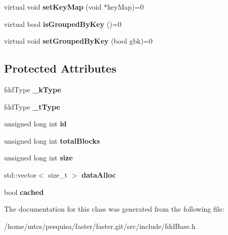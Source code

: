 \begin{DoxyCompactItemize}
\item 
\hypertarget{classfaster_1_1fddBase_ab36e7bd326034eca0721347b2a5b1bfe}{}virtual void {\bfseries set\+Key\+Map} (void $\ast$key\+Map)=0\label{classfaster_1_1fddBase_ab36e7bd326034eca0721347b2a5b1bfe}

\item 
\hypertarget{classfaster_1_1fddBase_a14ec9acc33546362f86ac34b369956fa}{}virtual bool {\bfseries is\+Grouped\+By\+Key} ()=0\label{classfaster_1_1fddBase_a14ec9acc33546362f86ac34b369956fa}

\item 
\hypertarget{classfaster_1_1fddBase_a0758eda48ad1cee20071ba8ce1852037}{}virtual void {\bfseries set\+Grouped\+By\+Key} (bool gbk)=0\label{classfaster_1_1fddBase_a0758eda48ad1cee20071ba8ce1852037}

\end{DoxyCompactItemize}
\subsection*{Protected Attributes}
\begin{DoxyCompactItemize}
\item 
\hypertarget{classfaster_1_1fddBase_a585bdd9659c1ab92cf615c73fc4d9ac7}{}fdd\+Type {\bfseries \+\_\+k\+Type}\label{classfaster_1_1fddBase_a585bdd9659c1ab92cf615c73fc4d9ac7}

\item 
\hypertarget{classfaster_1_1fddBase_a7ee5fc280f8eed2ffe97ef9c7a8b0919}{}fdd\+Type {\bfseries \+\_\+t\+Type}\label{classfaster_1_1fddBase_a7ee5fc280f8eed2ffe97ef9c7a8b0919}

\item 
\hypertarget{classfaster_1_1fddBase_a6ebf1389a80e31abed31f5b85d99fa1a}{}unsigned long int {\bfseries id}\label{classfaster_1_1fddBase_a6ebf1389a80e31abed31f5b85d99fa1a}

\item 
\hypertarget{classfaster_1_1fddBase_ac69c521f69cbe163b676f7723c9dd024}{}unsigned long int {\bfseries total\+Blocks}\label{classfaster_1_1fddBase_ac69c521f69cbe163b676f7723c9dd024}

\item 
\hypertarget{classfaster_1_1fddBase_a397adc12ccc9f7eccce83dfef625487c}{}unsigned long int {\bfseries size}\label{classfaster_1_1fddBase_a397adc12ccc9f7eccce83dfef625487c}

\item 
\hypertarget{classfaster_1_1fddBase_a47961f2f165f2e148d9cbbd1b59090d3}{}std\+::vector$<$ size\+\_\+t $>$ {\bfseries data\+Alloc}\label{classfaster_1_1fddBase_a47961f2f165f2e148d9cbbd1b59090d3}

\item 
\hypertarget{classfaster_1_1fddBase_acd5a472da183f35b13197804acadac4e}{}bool {\bfseries cached}\label{classfaster_1_1fddBase_acd5a472da183f35b13197804acadac4e}

\end{DoxyCompactItemize}


The documentation for this class was generated from the following file\+:\begin{DoxyCompactItemize}
\item 
/home/mtcs/pesquisa/faster/faster.\+git/src/include/fdd\+Base.\+h\end{DoxyCompactItemize}
